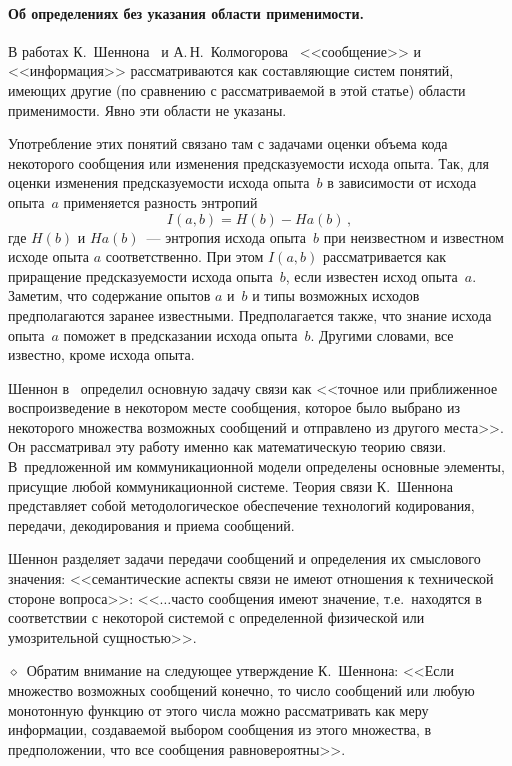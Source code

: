 \begin{multicols}{2}
\paragraph*{Об определениях без указания области применимости.}В
работах К.~Шеннона~\cite{11il, 12il} и А.\,Н.~Колмогорова~\cite{13il}
<<сообщение>> и <<информация>> рассматриваются как составляющие
систем понятий, имеющих другие (по сравнению с рассматриваемой в этой
статье) области применимости. Явно эти области не указаны.

Употребление этих понятий связано там с задачами оценки объема кода
некоторого сообщения или изменения предсказуемости исхода опыта. Так, для
оценки изменения предсказуемости исхода опыта~$b$ в зависимости от исхода
опыта~$a$ применяется разность энтропий
$$
I(a,b)=H(b)-Ha(b)\,,
$$
где $H(b)$ и $Ha(b)$~--- энтропия исхода опыта~$b$ при неизвестном и известном исходе
опыта $a$ соответственно. При этом $I(a,b)$ рассматривается как приращение
предсказуемости исхода опыта~$b$, если известен исход опыта~$a$. Заметим,
что содержание опытов $a$ и~$b$ и типы возможных исходов предполагаются
заранее известными. Предполагается также, что знание исхода опыта~$a$
поможет в предсказании исхода опыта~$b$. Другими словами, все известно,
кроме исхода опыта.

Шеннон в~\cite{11il} определил основную задачу связи как <<точное или
приближенное воспроизведение в некотором месте сообщения, которое было выбрано 
из некоторого множества возможных сообщений и отправлено из другого места>>. Он 
рассматривал эту работу именно как математическую теорию связи. В~предложенной 
им коммуникационной модели определены основные элементы, присущие любой 
коммуникационной системе. Теория связи К.~Шеннона представляет собой 
методологическое обеспечение технологий кодирования, передачи, декодирования и 
приема сообщений.

Шеннон разделяет задачи передачи сообщений и определения их
смыслового значения: <<семантические аспекты связи не имеют отношения к
технической стороне вопроса>>: <<$\ldots$часто сообщения имеют значение,
т.е.\ находятся в соответствии с некоторой системой с определенной
физической или умозрительной сущностью>>.

\noindent
$\diamond$~Обратим внимание на следующее утверждение К.~Шеннона:
<<Если множество возможных сообщений конечно, то число сообщений или
любую монотонную функцию от этого числа можно рассматривать как меру
информации, создаваемой выбором сообщения из этого множества, в
предположении, что все сообщения равновероятны>>.


\end{multicols}
